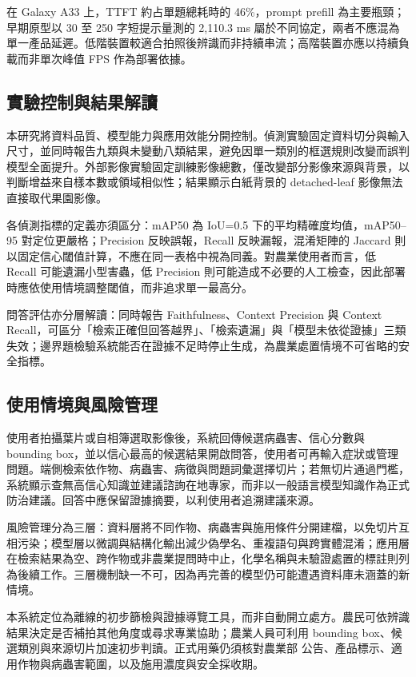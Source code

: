 \documentclass[10pt,twocolumn,a4paper]{article}
\begin{document}
在 Galaxy A33 上，TTFT 約占單題總耗時的 46\%，prompt prefill 為主要瓶頸；早期原型以 30 至 250 字短提示量測的 2,110.3 ms 屬於不同協定，兩者不應混為單一產品延遲。低階裝置較適合拍照後辨識而非持續串流；高階裝置亦應以持續負載而非單次峰值 FPS 作為部署依據。

\subsection{實驗控制與結果解讀}
本研究將資料品質、模型能力與應用效能分開控制。偵測實驗固定資料切分與輸入尺寸，並同時報告九類與未變動八類結果，避免因單一類別的框選規則改變而誤判模型全面提升。外部影像實驗固定訓練影像總數，僅改變部分影像來源與背景，以判斷增益來自樣本數或領域相似性；結果顯示白紙背景的 detached-leaf 影像無法直接取代果園影像。

各偵測指標的定義亦須區分：mAP50 為 IoU=0.5 下的平均精確度均值，mAP50–95 對定位更嚴格；Precision 反映誤報，Recall 反映漏報，混淆矩陣的 Jaccard 則以固定信心閾值計算，不應在同一表格中視為同義。對農業使用者而言，低 Recall 可能遺漏小型害蟲，低 Precision 則可能造成不必要的人工檢查，因此部署時應依使用情境調整閾值，而非追求單一最高分。

問答評估亦分層解讀：同時報告 Faithfulness、Context Precision 與 Context Recall，可區分「檢索正確但回答越界」、「檢索遺漏」與「模型未依從證據」三類失效；邊界題檢驗系統能否在證據不足時停止生成，為農業處置情境不可省略的安全指標。

\subsection{使用情境與風險管理}
使用者拍攝葉片或自相簿選取影像後，系統回傳候選病蟲害、信心分數與 bounding box，並以信心最高的候選結果開啟問答，使用者可再輸入症狀或管理問題。端側檢索依作物、病蟲害、病徵與問題詞彙選擇切片；若無切片通過門檻，系統顯示查無高信心知識並建議諮詢在地專家，而非以一般語言模型知識作為正式防治建議。回答中應保留證據摘要，以利使用者追溯建議來源。

風險管理分為三層：資料層將不同作物、病蟲害與施用條件分開建檔，以免切片互相污染；模型層以微調與結構化輸出減少偽學名、重複語句與跨實體混淆；應用層在檢索結果為空、跨作物或非農業提問時中止，化學名稱與未驗證處置的標註則列為後續工作。三層機制缺一不可，因為再完善的模型仍可能遭遇資料庫未涵蓋的新情境。

本系統定位為離線的初步篩檢與證據導覽工具，而非自動開立處方。農民可依辨識結果決定是否補拍其他角度或尋求專業協助；農業人員可利用 bounding box、候選類別與來源切片加速初步判讀。正式用藥仍須核對農業部\cite{moa2026} 公告、產品標示、適用作物與病蟲害範圍，以及施用濃度與安全採收期。
\end{document}
